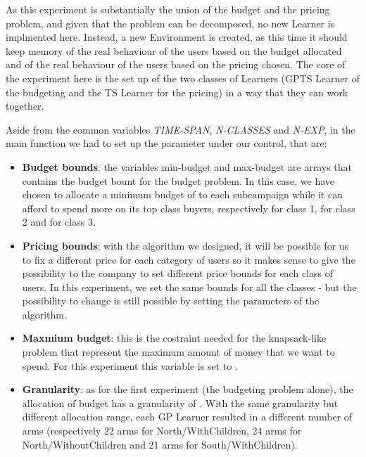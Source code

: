 As this experiment is substantially the union of the budget and the pricing problem, and given that the problem can be decomposed, no new Learner is implmented here. Instead, a new Environment is created, as this time it should keep memory of the real behaviour of the users based on the budget allocated and of the real behaviour of the users based on the pricing chosen. The core of the experiment here is the set up of the two classes of Learners (GPTS Learner of the budgeting and the TS Learner for the pricing) in a way that they can work together.

Aside from the common variables \textit{TIME-SPAN}, \textit{N-CLASSES} and \textit{N-EXP}, in the main function we had to set up the parameter under our control, that are:

\begin{itemize}
	\item \textbf{Budget bounds}: the variables min-budget and max-budget are arrays that contains the budget bount for the budget problem. In this case, we have chosen to allocate a minimum budget of  to each subcampaign while it can afford to spend more on its top class buyers, respectively  for class 1,  for class 2 and  for class 3.
	\\\item \textbf{Pricing bounds}: with the algorithm we designed, it will be possible for us to fix a different price for each category of users so it makes sense to give the possibility to the company to set different price bounds for each class of users. In this experiment, we set the same bounds for all the classes - but the possibility to change is still possible by setting the parameters of the algorithm.
	\item \textbf{Maxmium budget}: this is the costraint needed for the knapsack-like problem that represent the maximum amount of money that we want to spend. For this experiment this variable is set to .
	\item \textbf{Granularity}: as for the first experiment (the budgeting problem alone), the allocation of budget has a granularity of . With the same granularity but different allocation range, each GP Learner resulted in a different number of arms (respectively 22 arms for North/WithChildren, 24 arms for North/WithoutChildren and 21 arms for South/WithChildren).
\end{itemize}